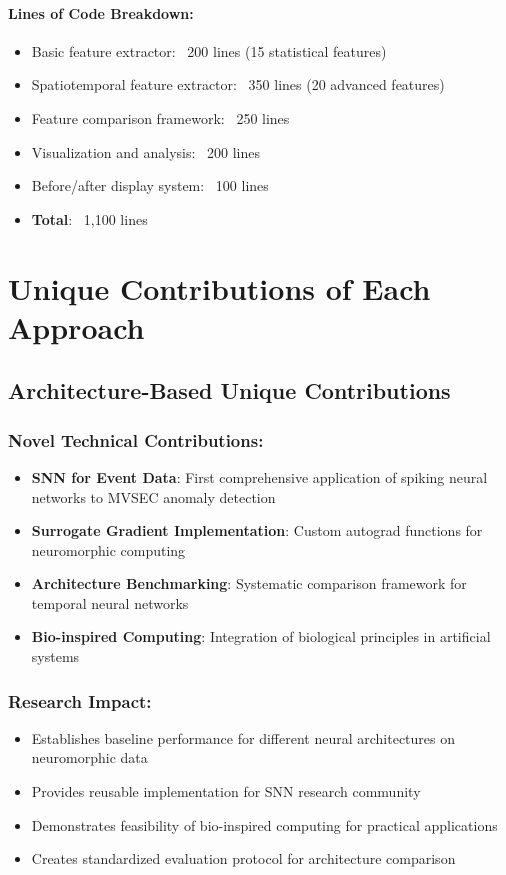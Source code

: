 \documentclass[11pt,a4paper]{article}
\begin{document}
\paragraph{Lines of Code Breakdown:}
\begin{itemize}
    \item Basic feature extractor: ~200 lines (15 statistical features)
    \item Spatiotemporal feature extractor: ~350 lines (20 advanced features)
    \item Feature comparison framework: ~250 lines
    \item Visualization and analysis: ~200 lines
    \item Before/after display system: ~100 lines
    \item \textbf{Total}: ~1,100 lines
\end{itemize}

\section{Unique Contributions of Each Approach}

\subsection{Architecture-Based Unique Contributions}

\subsubsection{Novel Technical Contributions:}
\begin{itemize}
    \item \textbf{SNN for Event Data}: First comprehensive application of spiking neural networks to MVSEC anomaly detection
    \item \textbf{Surrogate Gradient Implementation}: Custom autograd functions for neuromorphic computing
    \item \textbf{Architecture Benchmarking}: Systematic comparison framework for temporal neural networks
    \item \textbf{Bio-inspired Computing}: Integration of biological principles in artificial systems
\end{itemize}

\subsubsection{Research Impact:}
\begin{itemize}
    \item Establishes baseline performance for different neural architectures on neuromorphic data
    \item Provides reusable implementation for SNN research community
    \item Demonstrates feasibility of bio-inspired computing for practical applications
    \item Creates standardized evaluation protocol for architecture comparison
\end{itemize}
\end{document}

